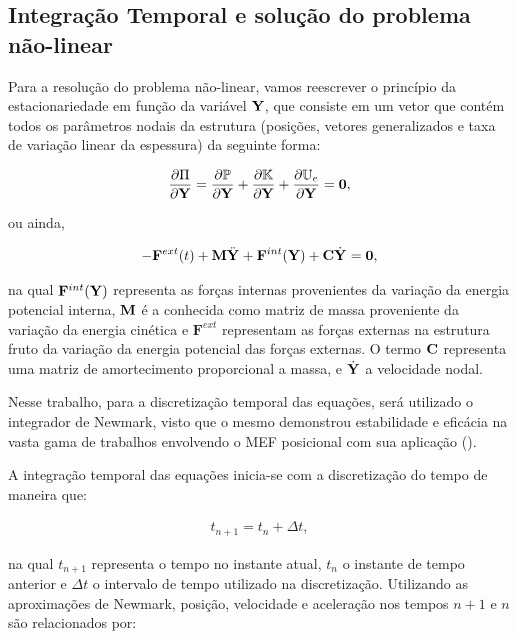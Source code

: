 \documentclass[tese_patricia]{subfiles}
\begin{document}
\subsection{Integração Temporal e solução do problema não-linear}

Para a resolução do problema não-linear, vamos reescrever o princípio da estacionariedade em função da variável $\mathbf{Y}$, que consiste em um vetor que contém todos os parâmetros nodais da estrutura (posições, vetores generalizados e taxa de variação linear da espessura) da seguinte forma:

\begin{align}
	\frac{\partial\Pi}{\partial\mathbf{Y}} = \frac{\partial\mathbb{P}}{\partial \mathbf{Y}} + \frac{\partial\mathbb{K}}{\partial \mathbf{Y}} + \frac{\partial\mathbb{U}_e}{\partial \mathbf{Y}} = \mathbf{0},
\end{align}

\noindent ou ainda,

\begin{align}
	- \mathbf{F}^{ext}(t) + \mathbf{M}\ddot{\mathbf{Y}}_{}+ \mathbf{F}^{int}(\mathbf{Y}) + \mathbf{C}\dot{\mathbf{Y}}_{} = \mathbf{0}, \label{eq:equi_forma_matricial}
\end{align}

\noindent na qual $ \mathbf{F}^{int}(\mathbf{Y})$ representa as forças internas provenientes da variação da energia potencial interna, $\mathbf{M}$ é a conhecida como matriz de massa proveniente da variação da energia cinética e $\mathbf{F}^{ext}$ representam as forças externas na estrutura fruto da variação da energia potencial das forças externas. O termo $\mathbf{C}$ representa uma matriz de amortecimento proporcional a massa, e $\dot{\mathbf{Y}}_{}$ a velocidade nodal.

Nesse trabalho, para a discretização temporal das equações, será utilizado o integrador de Newmark, visto que o mesmo demonstrou estabilidade e eficácia na vasta gama de trabalhos envolvendo o MEF posicional com sua aplicação (\cite{CodaG:2004,CodaP:2010,CarrazedoC:2010,CodaP:2011,SanchesC:2016}).
  
A integração temporal das equações inicia-se com a discretização do tempo de maneira que:

\begin{align}
	t_{n+1} = t_{n} + \Delta t, \label{eq:disc_tempo}
\end{align}

\noindent na qual $t_{n+1}$ representa o tempo no instante atual, $t_{n}$ o instante de tempo anterior e  $\Delta t$ o intervalo de tempo utilizado na discretização. Utilizando as aproximações de Newmark, posição, velocidade e aceleração nos tempos $n+1$ e $n$ são relacionados por:
\end{document}
